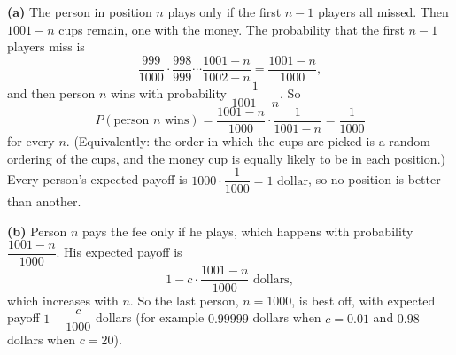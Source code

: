 \textbf{(a)} The person in position $n$ plays only if the first $n-1$ players all missed. Then $1001-n$ cups remain, one with the money. The probability that the first $n-1$ players miss is
\[
\dfrac{999}{1000}\cdot\dfrac{998}{999}\cdots\dfrac{1001-n}{1002-n}=\dfrac{1001-n}{1000},
\]
and then person $n$ wins with probability $\dfrac{1}{1001-n}$. So
\[
P(\text{person }n\text{ wins})=\dfrac{1001-n}{1000}\cdot\dfrac{1}{1001-n}=\dfrac{1}{1000}
\]
for every $n$. (Equivalently: the order in which the cups are picked is a random ordering of the cups, and the money cup is equally likely to be in each position.) Every person's expected payoff is $1000\cdot\dfrac{1}{1000}=\boxed{1\text{ dollar}}$, so no position is better than another.

\textbf{(b)} Person $n$ pays the fee only if he plays, which happens with probability $\dfrac{1001-n}{1000}$. His expected payoff is
\[
1-c\cdot\dfrac{1001-n}{1000}\text{ dollars},
\]
which increases with $n$. So the last person, $\boxed{n=1000}$, is best off, with expected payoff $1-\dfrac{c}{1000}$ dollars (for example $0.99999$ dollars when $c=0.01$ and $0.98$ dollars when $c=20$).
